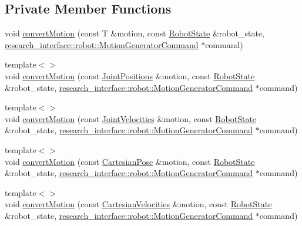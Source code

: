 \subsection*{Private Member Functions}
\begin{DoxyCompactItemize}
\item 
void \hyperlink{classfranka_1_1ControlLoop_a51052003f900ee3e99bc5409df6bbf47}{convert\+Motion} (const T \&motion, const \hyperlink{structfranka_1_1RobotState}{Robot\+State} \&robot\+\_\+state, \hyperlink{structresearch__interface_1_1robot_1_1MotionGeneratorCommand}{research\+\_\+interface\+::robot\+::\+Motion\+Generator\+Command} $\ast$command)
\item 
{\footnotesize template$<$$>$ }\\void \hyperlink{classfranka_1_1ControlLoop_aab46712ac11588d598ff9d99958ba98d}{convert\+Motion} (const \hyperlink{classfranka_1_1JointPositions}{Joint\+Positions} \&motion, const \hyperlink{structfranka_1_1RobotState}{Robot\+State} \&robot\+\_\+state, \hyperlink{structresearch__interface_1_1robot_1_1MotionGeneratorCommand}{research\+\_\+interface\+::robot\+::\+Motion\+Generator\+Command} $\ast$command)
\item 
{\footnotesize template$<$$>$ }\\void \hyperlink{classfranka_1_1ControlLoop_a64b502db834f429b6869c09bd1afd2fb}{convert\+Motion} (const \hyperlink{classfranka_1_1JointVelocities}{Joint\+Velocities} \&motion, const \hyperlink{structfranka_1_1RobotState}{Robot\+State} \&robot\+\_\+state, \hyperlink{structresearch__interface_1_1robot_1_1MotionGeneratorCommand}{research\+\_\+interface\+::robot\+::\+Motion\+Generator\+Command} $\ast$command)
\item 
{\footnotesize template$<$$>$ }\\void \hyperlink{classfranka_1_1ControlLoop_a1b12d574fd73dfeab9d44cc662435fb6}{convert\+Motion} (const \hyperlink{classfranka_1_1CartesianPose}{Cartesian\+Pose} \&motion, const \hyperlink{structfranka_1_1RobotState}{Robot\+State} \&robot\+\_\+state, \hyperlink{structresearch__interface_1_1robot_1_1MotionGeneratorCommand}{research\+\_\+interface\+::robot\+::\+Motion\+Generator\+Command} $\ast$command)
\item 
{\footnotesize template$<$$>$ }\\void \hyperlink{classfranka_1_1ControlLoop_ae6c2b0808a95542fa41e2351f7d8f242}{convert\+Motion} (const \hyperlink{classfranka_1_1CartesianVelocities}{Cartesian\+Velocities} \&motion, const \hyperlink{structfranka_1_1RobotState}{Robot\+State} \&robot\+\_\+state, \hyperlink{structresearch__interface_1_1robot_1_1MotionGeneratorCommand}{research\+\_\+interface\+::robot\+::\+Motion\+Generator\+Command} $\ast$command)
\end{DoxyCompactItemize}
